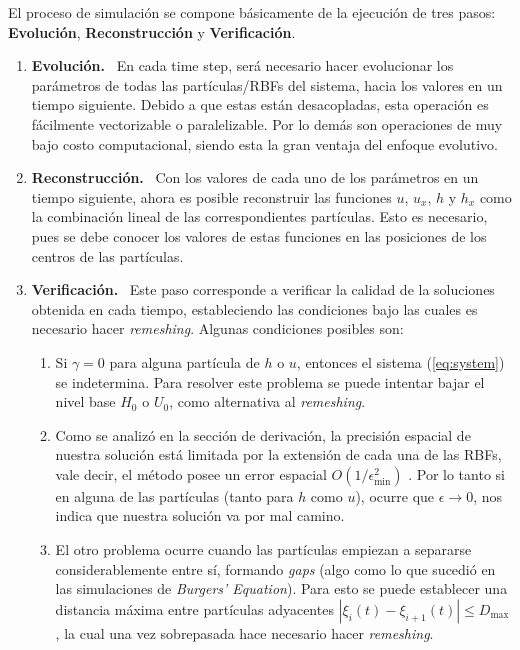 ﻿\documentclass[spanish]{article}
\begin{document}
    El proceso de simulación se compone básicamente de la ejecución de tres pasos: \textbf{Evolución}, \textbf{Reconstrucción} y \textbf{Verificación}.

    \begin{enumerate}
        \item \textbf{Evolución.} \  En cada time step, será necesario hacer evolucionar los parámetros de todas las partículas/RBFs del sistema, hacia los valores en un tiempo siguiente. Debido a que estas están desacopladas, esta operación es fácilmente vectorizable o paralelizable. Por lo demás son operaciones de muy bajo costo computacional, siendo esta la gran ventaja del enfoque evolutivo.
        \item \textbf{Reconstrucción.} \ Con los valores de cada uno de los parámetros en un tiempo siguiente, ahora es posible reconstruir las funciones $u$, $u_x$, $h$ y $h_x$ como la combinación lineal de las correspondientes partículas. Esto es necesario, pues se debe conocer los valores de estas funciones en las posiciones de los centros de las partículas.
        \item \textbf{Verificación.} \ Este paso corresponde a verificar la calidad de la soluciones obtenida en cada tiempo, estableciendo las condiciones bajo las cuales es necesario hacer \textit{remeshing}. Algunas condiciones posibles son:

        \begin{enumerate}
            \item Si $\gamma=0$ para alguna partícula de $h$ o $u$, entonces el sistema (\ref{eq:system}) se indetermina. Para resolver este problema se puede intentar bajar el nivel base $H_0$ o $U_0$, como alternativa al \textit{remeshing}.
            \item Como se analizó en la sección de derivación, la precisión espacial de nuestra solución está limitada por la extensión de cada una de las RBFs, vale decir, el método posee un error espacial $\displaystyle O(1 / \epsilon_{\text{min}}^2)$ \footnotemark[1]. Por lo tanto si en alguna de las partículas (tanto para $h$ como $u$), ocurre que $\epsilon \rightarrow 0$, nos indica que nuestra solución va por mal camino.
            \item El otro problema ocurre cuando las partículas empiezan a separarse considerablemente entre sí, formando \textit{gaps} (algo como lo que sucedió en las simulaciones de \textit{Burgers' Equation}). Para esto se puede establecer una distancia máxima entre partículas adyacentes $|\xi_i(t)-\xi_{i+1}(t)| \leq D_{\text{max}}$, la cual una vez sobrepasada hace necesario hacer \textit{remeshing}.
        \end{enumerate}
    \end{enumerate}
\end{document}
